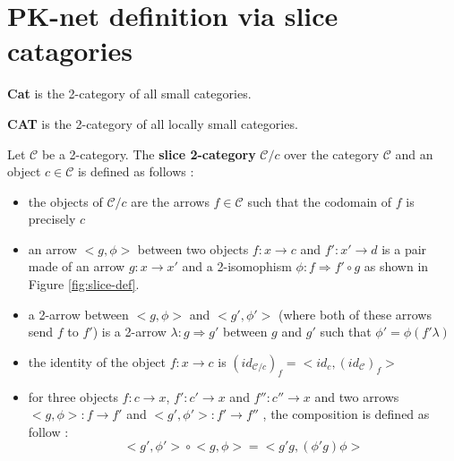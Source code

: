 \section{PK-net definition via slice catagories}
\begin{defn}[2-category]
\end{defn}

\begin{defn}[\bf Cat]
    \textbf{Cat}\label{nomencl:Cat} is the 2-category of all small categories.
\end{defn}
\begin{defn}[\bf CAT]
    \textbf{CAT}\label{nomencl:CAT} is the 2-category of all locally small categories.
\end{defn}

\begin{defn}
    \label{def:slice-2-cat}
    Let $\mathcal{C}$ be a 2-category. The \textbf{slice 2-category} $\mathcal{C}/c$\label{nomencl:slice} over the category $\mathcal{C}$  and an object $c \in \mathcal{C}$ is defined as follows :
    \begin{itemize}
        \item the objects of  $\mathcal{C}/c$ are the arrows $f\in \mathcal{C}$ such that the codomain of $f$ is precisely $c$
        \item an arrow $\big<g,\phi\big>$ between two objects $f : x \rightarrow c$ and $f' : x' \rightarrow d$ is a pair made of an arrow $g : x\rightarrow x'$ and a 2-isomophism $\phi : f \Rightarrow f'\circ g$ as shown in Figure \ref{fig:slice-def}.
        \item a 2-arrow between $\big<g,\phi\big>$ and $\big<g',\phi'\big>$ (where both of these arrows send $f$ to $f'$) is a 2-arrow
              $\lambda : g\Rightarrow g'$ between $g$ and $g'$ such that
              $\phi' = \phi(f'\lambda)$
        \item the identity of the object $f: x\rightarrow c$ is $(id_{\mathcal{C}/c})_f = \big<id_c, (id_\mathcal{C})_f\big>$
        \item for three objects 
        $f : c\rightarrow x $, 
        $f' : c' \rightarrow x$ and 
        $f'' :  c'' \rightarrow x$ and two arrows
        $\big<g,\phi\big> : f \rightarrow f'$ and
        $\big<g',\phi'\big> : f' \rightarrow f''$ , the composition is defined as follow :
              $$\big<g',\phi'\big>\circ\big<g,\phi\big> = \big<g'g,(\phi' g)\phi\big>$$
    \end{itemize}


\end{defn}

